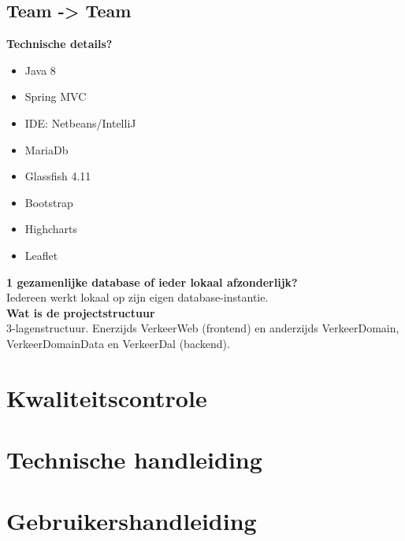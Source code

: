 \documentclass[a4paper]{article}
\begin{document}
\subsection{Team -> Team}

\textbf{Technische details?}\\
\begin{multicols}{2}
\begin{itemize}
\item Java 8
\item Spring MVC
\item IDE: Netbeans/IntelliJ
\item MariaDb
\item Glassfish 4.11
\item Bootstrap
\item Highcharts 
\item Leaflet
\end{itemize}
\end{multicols}

\textbf{1 gezamenlijke database of ieder lokaal afzonderlijk?}\\
Iedereen werkt lokaal op zijn eigen database-instantie.\\

\textbf{Wat is de projectstructuur}\\
3-lagenstructuur. Enerzijds VerkeerWeb (frontend) en anderzijds VerkeerDomain, VerkeerDomainData en VerkeerDal (backend).\\

\newpage
\section{Kwaliteitscontrole}
\label{sec:kwaliteitscontrole}


\newpage

\section{Technische handleiding}
\label{sec:technischehandleiding}


\newpage

\section{Gebruikershandleiding}
\label{sec:gebruikershandleiding}


\newpage
\end{document}
